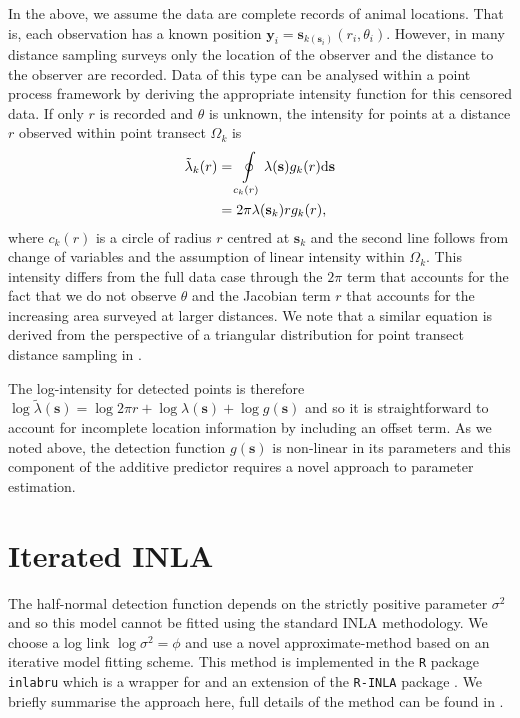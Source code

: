 \documentclass{statsoc}
\newcommand{\bs}{\mathbf{s}}
\newcommand{\bm}{\boldsymbol}  %
\newcommand{\tl}{\tilde{\lambda}}   %
\begin{document}
In the above, we assume the data are complete records of animal locations.  That is, each observation has a known position $\bm{y}_i = \bs_{k(\bs_i)}(r_i, \theta_i)$.  However, in many distance sampling surveys only the location of the observer and the distance to the observer are recorded.  Data of this type can be analysed within a point process framework by deriving the appropriate intensity function for this censored data. If only $r$ is recorded and $\theta$ is unknown, the intensity for points at a distance $r$ observed within point transect $\Omega_k$ is
\begin{align}
\label{intensity-incomplete}
\tl_k(r) &= \oint\displaylimits_{c_k(r)} \lambda(\bs)g_k(r)\mathrm{d}\bs \nonumber \\
&= 2\pi\lambda(\bs_k)rg_k(r),
\end{align}
where $c_k(r)$ is a circle of radius $r$ centred at $\bs_k$ and the second line follows from change of variables and the assumption of linear intensity within $\Omega_k$.  This intensity differs from the full data case through the $2\pi$  term that accounts for the fact that we do not observe $\theta$ and the Jacobian term $r$ that accounts for the increasing area surveyed at larger distances.  We note that a similar equation is derived from the perspective of a triangular distribution for point transect distance sampling in \cite{buckland_advanced_2004}.  

The log-intensity for detected points is therefore $\log\tl(\bs) = \log 2 \pi r + \log\lambda(\bs) + \log g(\bs)$ and so it is straightforward to account for incomplete location information by including an offset term.  As we noted above, the detection function $g(\bs)$ is non-linear in its parameters and this component of the additive predictor requires a novel approach to parameter estimation.

\section{Iterated INLA}
\label{sec-iinla}

The half-normal detection function depends on the strictly positive parameter $\sigma^2$ and so this model cannot be fitted using the standard INLA methodology.  We choose a log link $\log\sigma^2 = \phi$ and use a novel approximate-method based on an iterative model fitting scheme. This method is implemented in the \texttt{R} package \texttt{inlabru} which is a wrapper for and an extension of the \texttt{R-INLA} package \citep{lindgren_inlabru_2024}. We briefly summarise the approach here, full details of the method can be found in \cite{lindgren_inlabru_2024}.
\end{document}
